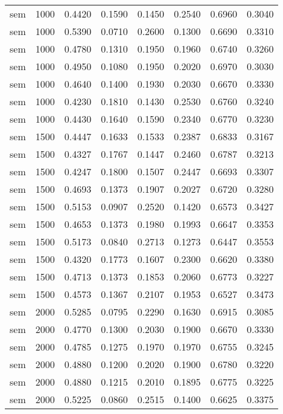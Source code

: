 \begin{scriptsize}
\begin{longtable}{cccccccc}
	sem      & 1000 & 0.4420 & 0.1590 & 0.1450 & 0.2540 & 0.6960 & 0.3040 \\
	sem      & 1000 & 0.5390 & 0.0710 & 0.2600 & 0.1300 & 0.6690 & 0.3310 \\
	sem      & 1000 & 0.4780 & 0.1310 & 0.1950 & 0.1960 & 0.6740 & 0.3260 \\
	sem      & 1000 & 0.4950 & 0.1080 & 0.1950 & 0.2020 & 0.6970 & 0.3030 \\
	sem      & 1000 & 0.4640 & 0.1400 & 0.1930 & 0.2030 & 0.6670 & 0.3330 \\
	sem      & 1000 & 0.4230 & 0.1810 & 0.1430 & 0.2530 & 0.6760 & 0.3240 \\
	sem      & 1000 & 0.4430 & 0.1640 & 0.1590 & 0.2340 & 0.6770 & 0.3230 \\
	sem      & 1500 & 0.4447 & 0.1633 & 0.1533 & 0.2387 & 0.6833 & 0.3167 \\
	sem      & 1500 & 0.4327 & 0.1767 & 0.1447 & 0.2460 & 0.6787 & 0.3213 \\
	sem      & 1500 & 0.4247 & 0.1800 & 0.1507 & 0.2447 & 0.6693 & 0.3307 \\
	sem      & 1500 & 0.4693 & 0.1373 & 0.1907 & 0.2027 & 0.6720 & 0.3280 \\
	sem      & 1500 & 0.5153 & 0.0907 & 0.2520 & 0.1420 & 0.6573 & 0.3427 \\
	sem      & 1500 & 0.4653 & 0.1373 & 0.1980 & 0.1993 & 0.6647 & 0.3353 \\
	sem      & 1500 & 0.5173 & 0.0840 & 0.2713 & 0.1273 & 0.6447 & 0.3553 \\
	sem      & 1500 & 0.4320 & 0.1773 & 0.1607 & 0.2300 & 0.6620 & 0.3380 \\
	sem      & 1500 & 0.4713 & 0.1373 & 0.1853 & 0.2060 & 0.6773 & 0.3227 \\
	sem      & 1500 & 0.4573 & 0.1367 & 0.2107 & 0.1953 & 0.6527 & 0.3473 \\
	sem      & 2000 & 0.5285 & 0.0795 & 0.2290 & 0.1630 & 0.6915 & 0.3085 \\
	sem      & 2000 & 0.4770 & 0.1300 & 0.2030 & 0.1900 & 0.6670 & 0.3330 \\
	sem      & 2000 & 0.4785 & 0.1275 & 0.1970 & 0.1970 & 0.6755 & 0.3245 \\
	sem      & 2000 & 0.4880 & 0.1200 & 0.2020 & 0.1900 & 0.6780 & 0.3220 \\
	sem      & 2000 & 0.4880 & 0.1215 & 0.2010 & 0.1895 & 0.6775 & 0.3225 \\
	sem      & 2000 & 0.5225 & 0.0860 & 0.2515 & 0.1400 & 0.6625 & 0.3375 \\

\end{longtable}
\end{scriptsize}

